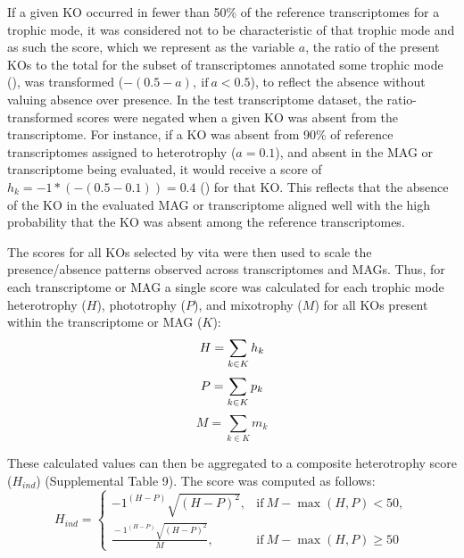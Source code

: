 \documentclass[12pt]{article}
\numberwithin{equation}{section}
\begin{document}
If a given KO occurred in fewer than 50\% of the reference transcriptomes for a trophic mode, it was considered not to be characteristic of that trophic mode and as such the score, which we represent as the variable $a$, the ratio of the present KOs to the total for the subset of transcriptomes annotated some trophic mode (), was transformed ($-(0.5 - a),\ \text{if} \ a<0.5$), to reflect the absence without valuing absence over presence. In the test transcriptome dataset, the ratio-transformed scores were negated when a given KO was absent from the transcriptome. For instance, if a KO was absent from 90\% of reference transcriptomes assigned to heterotrophy ($a = 0.1$), and absent in the MAG or transcriptome being evaluated, it would receive a score of $h_k = -1 * (-(0.5-0.1)) = 0.4$ () for that KO. This reflects that the absence of the KO in the evaluated MAG or transcriptome aligned well with the high probability that the KO was absent among the reference transcriptomes.

The scores for all KOs selected by vita were then used to scale the presence/absence patterns observed across transcriptomes and MAGs. Thus, for each transcriptome or MAG a single score was calculated for each trophic mode heterotrophy ($H$), phototrophy ($P$), and mixotrophy ($M$) for all KOs present within the transcriptome or MAG ($K$):
  \begin{equation}\label{eq:sum}
  H = \sum_{k \in K} h_k \\ 
  \end{equation}
  \begin{equation}
    P = \sum_{k \in K} p_k \\
\end{equation}
  \begin{equation}
    M = \sum_{k \in K} m_k
\end{equation}

These calculated values can then be aggregated to a composite heterotrophy score ($H_{ind}$) (Supplemental Table 9). The score was computed as follows: 
\begin{equation}\label{eq:hind}
  H_{ind}=
    \begin{cases}
      -1^{(H-P)}\sqrt{(H-P)^2}, & \text{if}\ M-\max(H,P)<50, \\
      \frac{{}-1^{(H-P)}\sqrt{(H-P)^2}}{M}, & \text{if} \ M-\max(H,P) \geq 50
    \end{cases}
  \end{equation}
  
\end{document}
